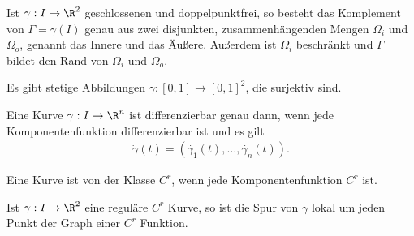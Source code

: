 \begin{prop}
Ist $\gamma: I\to\R^2$ geschlossenen und doppelpunktfrei, so besteht das
Komplement von $\Gamma = \gamma(I)$ genau aus zwei disjunkten,
zusammenhängenden Mengen $\Omega_i$ und $\Omega_o$, genannt das Innere und
das Äußere. Außerdem ist $\Omega_i$ beschränkt und $\Gamma$ bildet den Rand von
$\Omega_i$ und $\Omega_o$.
\end{prop}
\begin{prop}
Es gibt stetige Abbildungen $\gamma: [0,1]\to[0,1]^2$, die surjektiv
sind.
\end{prop}
\begin{prop}
Eine Kurve $\gamma: I \to \R^n$ ist differenzierbar genau dann, wenn jede
Komponentenfunktion differenzierbar ist und es gilt
\begin{align*}
\dot{\gamma}(t) = (\dot{\gamma_1}(t),\ldots,\dot{\gamma_n}(t)).
\end{align*}
\end{prop}
\begin{prop}
Eine Kurve ist von der Klasse $C^r$, wenn jede Komponentenfunktion $C^r$
ist.
\end{prop}
\begin{prop}
Ist $\gamma: I\to\R^2$ eine reguläre $C^r$ Kurve, so ist die Spur von $\gamma$
lokal um jeden Punkt der Graph einer $C^r$ Funktion.
\end{prop}
